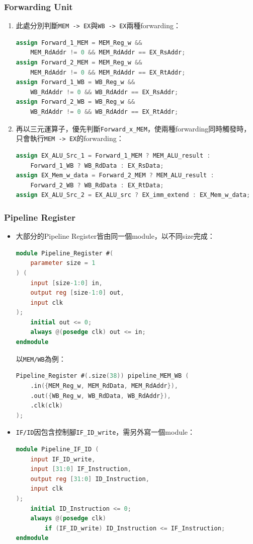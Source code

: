 \documentclass[12pt]{article}
\begin{document}
\subsubsection{Forwarding Unit}
\begin{enumerate}
    \item 此處分別判斷\texttt{MEM -> EX}與\texttt{WB -> EX}兩種forwarding：
    \begin{lstlisting}[language=Verilog]
assign Forward_1_MEM = MEM_Reg_w && 
    MEM_RdAddr != 0 && MEM_RdAddr == EX_RsAddr;
assign Forward_2_MEM = MEM_Reg_w && 
    MEM_RdAddr != 0 && MEM_RdAddr == EX_RtAddr;
assign Forward_1_WB = WB_Reg_w && 
    WB_RdAddr != 0 && WB_RdAddr == EX_RsAddr;
assign Forward_2_WB = WB_Reg_w && 
    WB_RdAddr != 0 && WB_RdAddr == EX_RtAddr;
    \end{lstlisting}
    \item 再以三元運算子，優先判斷\texttt{Forward\_x\_MEM}，使兩種forwarding同時觸發時，只會執行\texttt{MEM -> EX}的forwarding：
    \begin{lstlisting}[language=Verilog]
assign EX_ALU_Src_1 = Forward_1_MEM ? MEM_ALU_result : 
    Forward_1_WB ? WB_RdData : EX_RsData;
assign EX_Mem_w_data = Forward_2_MEM ? MEM_ALU_result : 
    Forward_2_WB ? WB_RdData : EX_RtData;
assign EX_ALU_Src_2 = EX_ALU_src ? EX_imm_extend : EX_Mem_w_data;
    \end{lstlisting}
\end{enumerate}

\subsubsection{Pipeline Register}
\begin{itemize}
    \item 大部分的Pipeline Register皆由同一個module，以不同size完成：
    \begin{lstlisting}[language=Verilog]
module Pipeline_Register #(
    parameter size = 1
) (
    input [size-1:0] in,
    output reg [size-1:0] out,
    input clk
);
    initial out <= 0;
    always @(posedge clk) out <= in;
endmodule
    \end{lstlisting}
    以\texttt{MEM/WB}為例：
    \begin{lstlisting}[language=Verilog]
Pipeline_Register #(.size(38)) pipeline_MEM_WB (
    .in({MEM_Reg_w, MEM_RdData, MEM_RdAddr}),
    .out({WB_Reg_w, WB_RdData, WB_RdAddr}),
    .clk(clk)
);
    \end{lstlisting}
    \item \texttt{IF/ID}因包含控制腳\texttt{IF\_ID\_write}，需另外寫一個module：
    \begin{lstlisting}[language=Verilog]
module Pipeline_IF_ID (
    input IF_ID_write,
    input [31:0] IF_Instruction,
    output reg [31:0] ID_Instruction,
    input clk
);
    initial ID_Instruction <= 0;
    always @(posedge clk) 
        if (IF_ID_write) ID_Instruction <= IF_Instruction;
endmodule
    \end{lstlisting}
\end{itemize}
\end{document}
